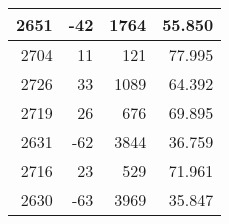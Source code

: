 \begin{longtable}{|r|r|r|r|}
		2651                                                                                               & -42                                                    & 1764                                                            & 55.850                                                                                                               \\ \hline
		2704                                                                                               & 11                                                     & 121                                                             & 77.995                                                                                                               \\ \hline
		2726                                                                                               & 33                                                     & 1089                                                            & 64.392                                                                                                               \\ \hline
		2719                                                                                               & 26                                                     & 676                                                             & 69.895                                                                                                               \\ \hline
		2631                                                                                               & -62                                                    & 3844                                                            & 36.759                                                                                                               \\ \hline
		2716                                                                                               & 23                                                     & 529                                                             & 71.961                                                                                                               \\ \hline
		2630                                                                                               & -63                                                    & 3969                                                            & 35.847                                                                                                               \\ \hline

\end{longtable}

